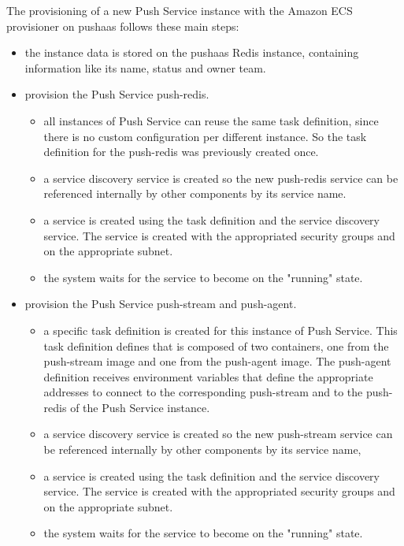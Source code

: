 The provisioning of a new Push Service instance with the Amazon ECS provisioner on pushaas follows these main steps:
\begin{itemize}
    \item the instance data is stored on the pushaas Redis instance, containing information like its name, status and owner team.
    \item provision the Push Service push-redis.
        \begin{itemize}
            \item all instances of Push Service can reuse the same task definition, since there is no custom configuration per different instance. So the task definition for the push-redis was previously created once.
            \item a service discovery service is created so the new push-redis service can be referenced internally by other components by its service name.
            \item a service is created using the task definition and the service discovery service. The service is created with the appropriated security groups and on the appropriate subnet.
            \item the system waits for the service to become on the "running" state.
        \end{itemize}
    \item provision the Push Service push-stream and push-agent.
        \begin{itemize}
            \item a specific task definition is created for this instance of Push Service. This task definition defines that is composed of two containers, one from the push-stream image and one from the push-agent image. The push-agent definition receives environment variables that define the appropriate addresses to connect to the corresponding push-stream and to the push-redis of the Push Service instance.
            \item a service discovery service is created so the new push-stream service can be referenced internally by other components by its service name,
            \item a service is created using the task definition and the service discovery service. The service is created with the appropriated security groups and on the appropriate subnet.
            \item the system waits for the service to become on the "running" state.
        \end{itemize}

\end{itemize}
